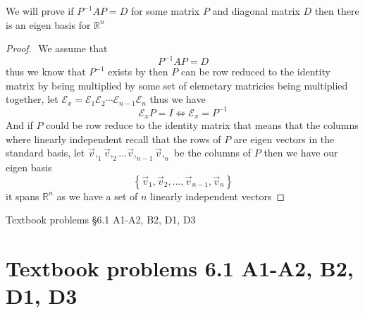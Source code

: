 \documentclass[11pt]{book}
\begin{document}
We will prove if $P^{-1} AP= D$ for some matrix $P$ and diagonal matrix $D$ then there is an eigen basis for $\mathbb{R} ^{n} $ 

\begin{proof}
$ $\newline
    We assume that 
    \[
    P^{-1} AP= D
    \]
    thus we know that $P^{-1} $ exists by then $P$ can be row reduced to the identity matrix by being multiplied by some set of elemetary matricies being multiplied together, let $\mathcal{E}_{x} = \mathcal{E} _{1}  \mathcal{E} _{2}  \dotsb   \mathcal{E} _{n - 1}  \mathcal{E} _{n} $ thus we have 
    \[
    \mathcal{E} _{x} P = I \Leftrightarrow \mathcal{E} _{x} = P^{-1} 
    \]
    And if $P$ could be row reduce to the identity matrix that means that the columns where linearly independent recall that the rows of $P$ are eigen vectors in the standard basis, let $\vec{v} ,_{1}  \vec{v} ,_{2}  \dotsc   \vec{v} ,_{n - 1}  \vec{v} ,_{n} $ be the columns of $P$ then we have our eigen basis 
    \[
    \left\{ \vec{v} _{1} , \vec{v} _{2} , \dotsc  , \vec{v} _{n - 1} , \vec{v} _{n}  \right\} 
    \]
    it spans $\mathbb{R} ^{n} $ as we have a set of $n$ linearly independent vectors
\end{proof}

Textbook problems §6.1 A1-A2, B2, D1, D3
\section{Textbook problems 6.1 A1-A2, B2, D1, D3}%
\label{sec:textbook_problems_6_1_a1_a2_b2_d1_d3}
\end{document}
